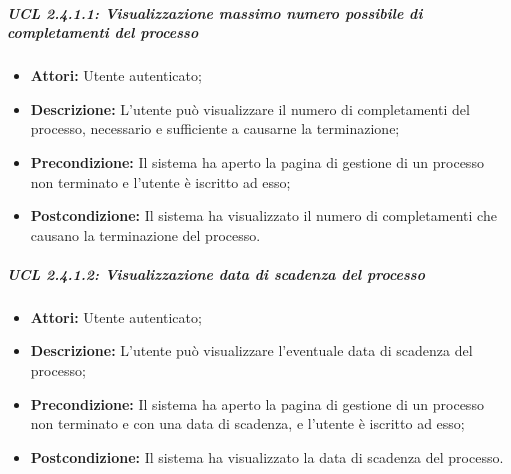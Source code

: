 \subparagraph{UCL 2.4.1.1: Visualizzazione massimo numero possibile di completamenti del processo}
\begin{itemize}
\item \textbf{Attori:} Utente autenticato;
\item \textbf{Descrizione:} L'utente può visualizzare il numero di completamenti del processo, necessario e sufficiente a causarne la terminazione;
\item \textbf{Precondizione:} Il sistema ha aperto la pagina di gestione di un processo non terminato e l'utente è iscritto ad esso;
\item \textbf{Postcondizione:} Il sistema ha visualizzato il numero di completamenti che causano la terminazione del processo.
\end{itemize}

\subparagraph{UCL 2.4.1.2: Visualizzazione data di scadenza del processo}
\begin{itemize}
\item \textbf{Attori:} Utente autenticato;
\item \textbf{Descrizione:} L'utente può visualizzare l'eventuale data di scadenza del processo;
\item \textbf{Precondizione:} Il sistema ha aperto la pagina di gestione di un processo  non terminato e con una data di scadenza, e l'utente è iscritto ad esso;
\item \textbf{Postcondizione:} Il sistema ha visualizzato la data di scadenza del processo.
\end{itemize}

